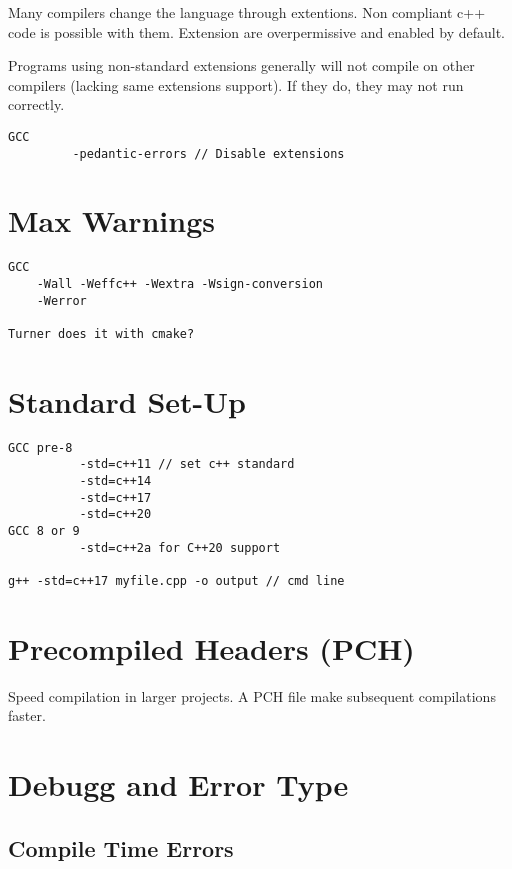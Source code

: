 \documentclass[openany]{report}
\begin{document}
Many compilers change the language through extentions. Non compliant c++ code is possible with them.
Extension are overpermissive and enabled by default.


Programs using non-standard extensions generally will not compile on other compilers 
(lacking same extensions support). If they do, they may not run correctly.

\begin{verbatim}
GCC
         -pedantic-errors // Disable extensions
\end{verbatim}

\section{Max Warnings}

\begin{verbatim}
GCC 
    -Wall -Weffc++ -Wextra -Wsign-conversion
    -Werror

Turner does it with cmake?
\end{verbatim}

\section{Standard Set-Up}

\begin{verbatim}
GCC pre-8
          -std=c++11 // set c++ standard
          -std=c++14
          -std=c++17
          -std=c++20 
GCC 8 or 9
          -std=c++2a for C++20 support

g++ -std=c++17 myfile.cpp -o output // cmd line
\end{verbatim}

\section{Precompiled Headers (PCH)}

Speed compilation in larger projects. A PCH file make subsequent compilations faster.




\section{Debugg and Error Type}

\subsection{Compile Time Errors}
\end{document}
